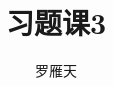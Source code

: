 \documentclass[12pt]{article}
\newcommand{\hei}{\CJKfamily{hei}}                          %
\begin{document}
\author{罗雁天}
\title{习题课3}
\maketitle

\medskip

\begin{enumerate}

%
%	

\end{enumerate}
\end{document}
